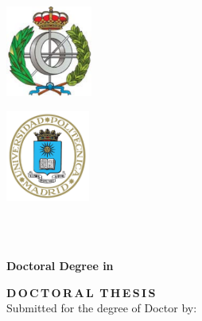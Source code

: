 
\begin{minipage}{0.20\textwidth}
        \includegraphics[width = 0.9\linewidth, height = 3cm, keepaspectratio]{0_frontmatter/figures/escudofi.pdf}
\end{minipage}
\begin{minipage}{0.20\textwidth}
        \includegraphics[width = 0.9\linewidth, height = 3cm, keepaspectratio]{0_frontmatter/figures/EscudoUPM.png}
\end{minipage}
\begin{minipage}{0.65\textwidth} \centering
    {\UNIVERSITY}\\
    {\UPMCentre}\\
\end{minipage}

\vspace{15 mm}

\begin{center}
\begin{spacing}{1.5}
\textbf{\large {Doctoral Degree in {\DoctoralProgramme}}}\\
\end{spacing}
\vspace{10 mm}

\begin{spacing}{2.0}
\textbf{\LARGE {\thesisTitle}}
\end{spacing}

\vspace{15 mm}

\begin{spacing}{1.3}
\textbf{\LARGE {D\,O\,C\,T\,O\,R\,A\,L\, T\,H\,E\,S\,I\,S}}\\
\medskip
{\large {Submitted for the degree of Doctor by:}}
\end{spacing}
\end{center}



